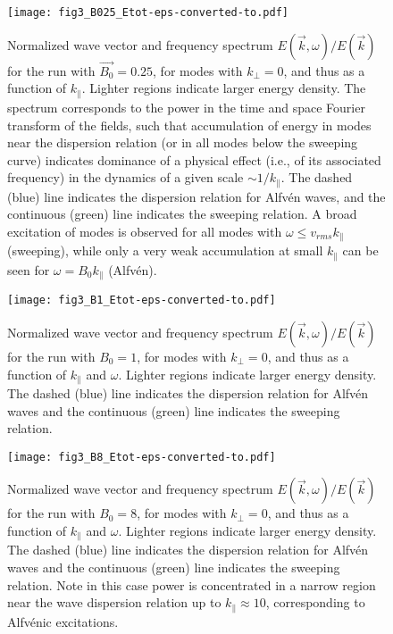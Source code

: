 \begin{figure}
  \centering 
  \texttt{[image: fig3\_B025\_Etot-eps-converted-to.pdf]}
  \caption{Normalized wave vector and frequency spectrum $E(\vec{k},
    \omega)/E(\vec{k})$ for the run with $\vec{B_0}=0.25$, for modes
    with $k_\perp=0$, and thus as a function of $k_\parallel$. Lighter
    regions indicate larger energy density. The spectrum corresponds
    to the power in the time and space Fourier transform of the
    fields, such that accumulation of energy in modes near the
    dispersion relation (or in all modes below the sweeping curve)
    indicates dominance of a physical effect (i.e., of its associated
    frequency) in the dynamics of a given scale $\sim
    1/k_\parallel$. The dashed (blue) line indicates the dispersion
    relation for Alfv\'en waves, and the continuous (green) line
    indicates the sweeping relation. A broad excitation of modes is
    observed for all modes with $\omega \leq v_{rms} k_\parallel$
    (sweeping), while only a very weak accumulation at small
    $k_\parallel$ can be seen for $\omega=B_0 k_\parallel$
    (Alfv\'en).}
  \label{fig3:B025_bvf_Etot_kperp0}
\end{figure}

\begin{figure}
  \centering
  \texttt{[image: fig3\_B1\_Etot-eps-converted-to.pdf]}
  \caption{Normalized wave vector and frequency spectrum $E(\vec{k},
    \omega)/E(\vec{k})$ for the run with $B_0=1$, for modes with
    $k_\perp=0$, and thus as a function of $k_\parallel$ and
    $\omega$. Lighter regions indicate larger energy density. The
    dashed (blue) line indicates the dispersion relation for Alfv\'en
    waves and the continuous (green) line indicates the sweeping
    relation.}
  \label{fig3:B1_bvf_Etot_kperp0}
\end{figure}

\begin{figure}
  \centering
  \texttt{[image: fig3\_B8\_Etot-eps-converted-to.pdf]}
  \caption{Normalized wave vector and frequency spectrum $E(\vec{k},
    \omega)/E(\vec{k})$ for the run with $B_0=8$, for modes with
    $k_\perp=0$, and thus as a function of $k_\parallel$ and
    $\omega$. Lighter regions indicate larger energy density. The
    dashed (blue) line indicates the dispersion relation for Alfv\'en
    waves and the continuous (green) line indicates the sweeping
    relation. Note in this case power is concentrated in a narrow
    region near the wave dispersion relation up to 
    $k_\parallel \approx 10$, corresponding to Alfv\'enic
    excitations.}
  \label{fig3:B8_bvf_Etot_kperp0}
\end{figure}



